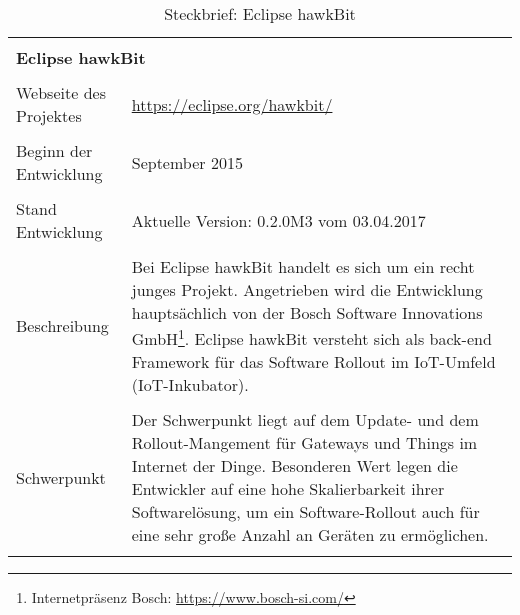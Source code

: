 \begin{table}[H]
 \centering
 \caption{Steckbrief: Eclipse hawkBit}
 \begin{framed}
 \begin{tabular}{l|l|l|l}
  \multicolumn{4}{l}{}\\
  \multicolumn{4}{l}{\textbf{Eclipse hawkBit}}\\
  \multicolumn{4}{l}{}\\
  \toprule
  \multicolumn{2}{l|}{Webseite des Projektes} & \multicolumn{2}{p{8cm}}{\url{https://eclipse.org/hawkbit/}}\\
  
  \multicolumn{2}{l|}{} & \multicolumn{2}{l}{}\\
  
  \multicolumn{2}{l|}{Beginn der Entwicklung} & \multicolumn{2}{p{8cm}}{September 2015}\\
  
  \multicolumn{2}{l|}{} & \multicolumn{2}{l}{}\\
  
  \multicolumn{2}{l|}{Stand Entwicklung} & \multicolumn{2}{p{8cm}}{Aktuelle Version: 0.2.0M3 vom 03.04.2017} \\
  
  \multicolumn{2}{l|}{} & \multicolumn{2}{l}{} \\
  
  \multicolumn{2}{l|}{Beschreibung} &  \multicolumn{2}{p{8cm}}{
  Bei Eclipse hawkBit handelt es sich um ein recht junges Projekt. Angetrieben wird die Entwicklung hauptsächlich von der 
  Bosch Software Innovations GmbH\footnote{Internetpräsenz Bosch: \url{https://www.bosch-si.com/}}.
  Eclipse hawkBit versteht sich als back-end Framework für das Software Rollout im \ac{IoT}-Umfeld (\ac{IoT}-Inkubator).
  } \\
  
  \multicolumn{2}{l|}{} & \multicolumn{2}{l}{} \\
  
  \multicolumn{2}{l|}{Schwerpunkt} &  \multicolumn{2}{p{8cm}}{
  Der Schwerpunkt liegt auf dem Update- und dem Rollout-Mangement für Gateways und Things im Internet der Dinge.
  Besonderen Wert legen die Entwickler auf eine hohe Skalierbarkeit ihrer Softwarelösung, um ein Software-Rollout auch 
  für eine sehr große Anzahl an Geräten zu ermöglichen.
  } \\
  
  \multicolumn{2}{l|}{} & \multicolumn{2}{l}{} \\
  

\end{tabular}
\end{framed}
\end{table}

